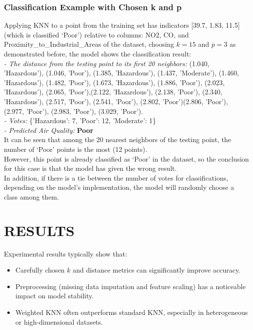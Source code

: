 \documentclass[10pt,twocolumn]{article}
\begin{document}
\subsubsection{Classification Example with Chosen k and p}
Applying KNN to a point from the training set has indicators [39.7, 1.83, 11.5] (which is classified ‘Poor’) relative to columns: NO2, CO, and Proximity\_to\_Industrial\_Areas of the dataset, choosing $k=15$ and $p=3$ as demonstrated before, the model shows the classification result:\\ 
\textit{- The distance from the testing point to its first 20 neighbors:} (1.040, 'Hazardous'), (1.046, 'Poor'), (1.385, 'Hazardous'), (1.437, 'Moderate'), (1.460, 'Hazardous'), (1.482, 'Poor'), (1.673, 'Hazardous'), (1.886, 'Poor'), (2.023, 'Hazardous'), (2.065, 'Poor'),(2.122, 'Hazardous'), (2.138, 'Poor'), (2.340, 'Hazardous'), (2.517, 'Poor'), (2.541, 'Poor'), (2.802, 'Poor')(2.806, 'Poor'), (2.977, 'Poor'), (2.983, 'Poor'), (3.029, 'Poor').\\
\textit{- Votes:} \{'Hazardous': 7, 'Poor': 12, 'Moderate': 1\}\\
\textit{- Predicted Air Quality:} \textbf{Poor}\\
 It can be seen that among the 20 nearest neighbors of the testing point, the number of ‘Poor’ points is the most (12 points). \\
 However, this point is already classified as ‘Poor’ in the dataset, so the conclusion for this case is that the model has given the wrong result.\\
In addition, if there is a tie between the number of votes for classifications, depending on the model's implementation, the model will randomly choose a class among them.
\section{RESULTS}
Experimental results typically show that:
\begin{itemize}
    \item Carefully chosen $k$ and distance metrics can significantly improve accuracy.
    \item Preprocessing (missing data imputation and feature scaling) has a noticeable impact on model stability.
    \item Weighted KNN often outperforms standard KNN, especially in heterogeneous or high-dimensional datasets.
\end{itemize}
\end{document}
